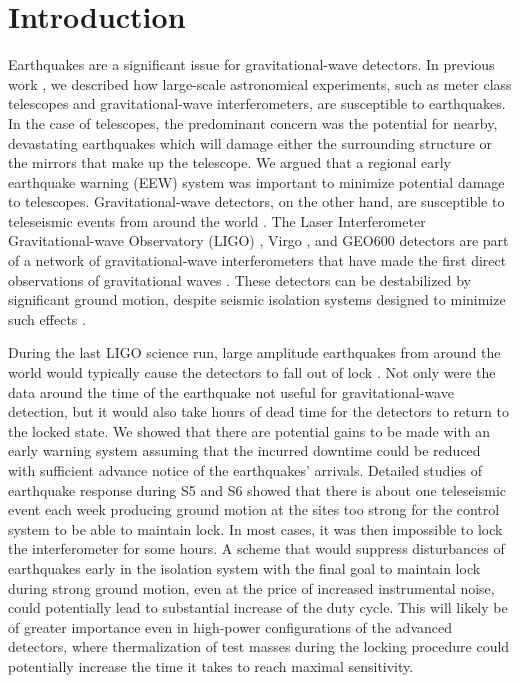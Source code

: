 \documentclass[reprint, prl, aps, showpacs]{revtex4-1}
\begin{document}
\section{Introduction}
\label{sec:Intro}

Earthquakes are a significant issue for gravitational-wave detectors. In previous work \cite{CoSt2015}, we described how large-scale astronomical experiments, such as meter class telescopes and gravitational-wave interferometers, are susceptible to earthquakes. In the case of telescopes, the predominant concern was the potential for nearby, devastating earthquakes which will damage either the surrounding structure or the mirrors that make up the telescope. We argued that a regional early earthquake warning (EEW) \cite{Al2012,KuAl2013a,KuAl2013b,KuHe2014,CoLa2009a,CoLa2009b,BoAl2014,HoKa2008} system was important to minimize potential damage to telescopes. 
Gravitational-wave detectors, on the other hand, are susceptible to teleseismic events from around the world \cite{MaFa2012}. 
The Laser Interferometer Gravitational-wave Observatory (LIGO) \cite{aligo}, Virgo \cite{avirgo}, and GEO600 \cite{Gr2010} detectors are part of a network of gravitational-wave interferometers that have made the first direct observations of gravitational waves \cite{AbEA2016a,AbEA2016e}. These detectors can be destabilized by significant ground motion, despite seismic isolation systems designed to minimize such effects \cite{AbAd2002,StAb2009}.

During the last LIGO science run, large amplitude earthquakes from around the world would typically cause the detectors to fall out of lock \cite{CoSt2015}. Not only were the data around the time of the earthquake not useful for gravitational-wave detection, but it would also take hours of dead time for the detectors to return to the locked state. 
We showed that there are potential gains to be made with an early warning system assuming that the incurred downtime could be reduced with sufficient advance notice of the earthquakes' arrivals.
Detailed studies of earthquake response during S5 and S6 showed that there is about one teleseismic event each week producing ground motion at the sites too strong for the control system to be able to maintain lock. In most cases, it was then impossible to lock the interferometer for some hours. A scheme that would suppress disturbances of earthquakes early in the isolation system with the final goal to maintain lock during strong ground motion, even at the price of increased instrumental noise, could potentially lead to substantial increase of the duty cycle. This will likely be of greater importance even in high-power configurations of the advanced detectors, where thermalization of test masses during the locking procedure could potentially increase the time it takes to reach maximal sensitivity.
\end{document}
